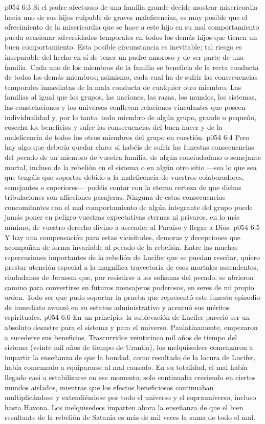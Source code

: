 \vs p054 6:3 \pc Si el padre afectuoso de una familia grande decide mostrar misericordia hacia uno de sus hijos culpable de graves maleficencias, es muy posible que el ofrecimiento de la misericordia que se hace a este hijo en su mal comportamiento pueda ocasionar adversidades temporales en todos los demás hijos que tienen un buen comportamiento. Esta posible circunstancia es inevitable; tal riesgo es inseparable del hecho en sí de tener un padre amoroso y de ser parte de una familia. Cada uno de los miembros de la familia se beneficia de la recta conducta de todos los demás miembros; asimismo, cada cual ha de sufrir las consecuencias temporales inmediatas de la mala conducta de cualquier otro miembro. Las familias al igual que los grupos, las naciones, las razas, los mundos, los sistemas, las constelaciones y los universos conllevan relaciones vinculantes que poseen individualidad y, por lo tanto, todo miembro de algún grupo, grande o pequeño, cosecha los beneficios y sufre las consecuencias del buen hacer y de la maleficencia de todos los otros miembros del grupo en cuestión.
\vs p054 6:4 Pero hay algo que debería quedar claro: si habéis de sufrir las funestas consecuencias del pecado de un miembro de vuestra familia, de algún conciudadano o semejante mortal, incluso de la rebelión en el sistema o en algún otro sitio ---sea lo que sea que tengáis que soportar debido a la maleficencia de vuestros colaboradores, semejantes o superiores--- podéis contar con la eterna certeza de que dichas tribulaciones son aflicciones pasajeras. Ninguna de estas consecuencias concomitantes con el mal comportamiento de algún integrante del grupo puede jamás poner en peligro vuestras expectativas eternas ni privaros, en lo más mínimo, de vuestro derecho divino a ascender al Paraíso y llegar a Dios.
\vs p054 6:5 Y hay una compensación para estas vicisitudes, demoras y decepciones que acompañan de forma invariable al pecado de la rebelión. Entre las muchas repercusiones importantes de la rebelión de Lucifer que se puedan reseñar, quiero prestar atención especial a la magnífica trayectoria de esos mortales ascendentes, ciudadanos de Jerusem que, por resistirse a los sofismas del pecado, se abrieron camino para convertirse en futuros mensajeros poderosos, en seres de mi propio orden. Todo ser que pudo soportar la prueba que representó este funesto episodio de inmediato avanzó en su estatus administrativo y acentuó sus méritos espirituales.
\vs p054 6:6 \pc En un principio, la sublevación de Lucifer pareció ser un absoluto desastre para el sistema y para el universo. Paulatinamente, empezaron a sucederse sus beneficios. Trascurridos veinticinco mil años de tiempo del sistema (veinte mil años de tiempo de Urantia), los melquisedecs comenzaron a impartir la enseñanza de que la bondad, como resultado de la locura de Lucifer, había comenzado a equipararse al mal causado. En su totalidad, el mal había llegado casi a estabilizarse en ese momento; solo continuaba creciendo en ciertos mundos aislados, mientras que los efectos beneficiosos continuaban multiplicándose y extendiéndose por todo el universo y el suprauniverso, incluso hasta Havona. Los melquisedecs imparten ahora la enseñanza de que el bien resultante de la rebelión de Satania es más de mil veces la suma de todo el mal.
